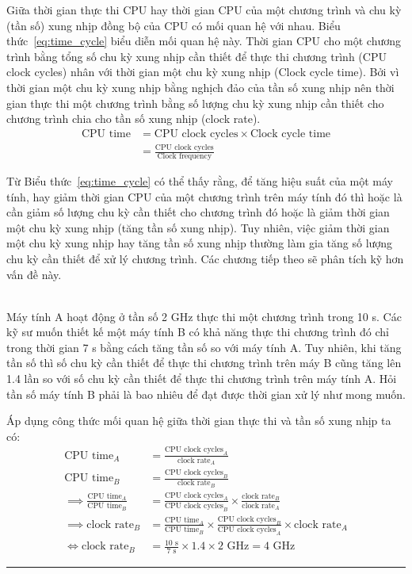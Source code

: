 Giữa thời gian thực thi CPU hay thời gian CPU của một chương trình và chu kỳ (tần số) xung nhịp đồng bộ của CPU có mối quan hệ với nhau. Biểu thức~\ref{eq:time_cycle} biểu diễn mối quan hệ này. Thời gian CPU cho một chương trình bằng tổng số chu kỳ xung nhịp cần thiết để thực thi chương trình (CPU clock cycles) nhân với thời gian một chu kỳ xung nhịp (Clock cycle time). Bởi vì thời gian một chu kỳ xung nhịp bằng nghịch đảo của tần số xung nhịp nên thời gian thực thi một chương trình bằng số lượng chu kỳ xung nhịp cần thiết cho chương trình chia cho tần số xung nhịp (clock rate).
\begin{align}
\label{eq:time_cycle}
\text{CPU time} &= \text{CPU clock cycles} \times \text{Clock cycle time} \nonumber\\
 &= \frac{\text{CPU clock cycles}}{\text{Clock frequency}}
\end{align}

Từ Biểu thức~\ref{eq:time_cycle} có thể thấy rằng, để tăng hiệu suất của một máy tính, hay giảm thời gian CPU của một chương trình trên máy tính đó thì hoặc là cần giảm số lượng chu kỳ cần thiết cho chương trình đó hoặc là giảm thời gian một chu kỳ xung nhịp (tăng tần số xung nhịp). Tuy nhiên, việc giảm thời gian một chu kỳ xung nhịp hay tăng tần số xung nhịp thường làm gia tăng số lượng chu kỳ cần thiết để xử lý chương trình. Các chương tiếp theo sẽ phân tích kỹ hơn vấn đề này.

\begin{exmp}
\hrulefill\\
Máy tính A hoạt động ở tần số 2 GHz thực thi một chương trình trong 10 s. Các kỹ sư muốn thiết kế một máy tính B có khả năng thực thi chương trình đó chỉ trong thời gian 7 s bằng cách tăng tần số so với máy tính A. Tuy nhiên, khi tăng tần số thì số chu kỳ cần thiết để thực thi chương trình trên máy B cũng tăng lên 1.4 lần so với số chu kỳ cần thiết để thực thi chương trình trên máy tính A. Hỏi tần số máy tính B phải là bao nhiêu để đạt được thời gian xử lý như mong muốn. 
\end{exmp}
\begin{answ}
Áp dụng công thức mối quan hệ giữa thời gian thực thi và tần số xung nhịp ta có:
\begin{align*}
\text{CPU time}_A &= \frac{\text{CPU clock cycles}_A}{\text{clock rate}_A}\\
\text{CPU time}_B &= \frac{\text{CPU clock cycles}_B}{\text{clock rate}_B}\\
\implies \frac{\text{CPU time}_A}{\text{CPU time}_B} &= \frac{\text{CPU clock cycles}_A}{\text{CPU clock cycles}_B} \times \frac{\text{clock rate}_B}{\text{clock rate}_A} \\
\implies \text{clock rate}_B &= \frac{\text{CPU time}_A}{\text{CPU time}_B} \times \frac{\text{CPU clock cycles}_B}{\text{CPU clock cycles}_A} \times \text{clock rate}_A \\
\Leftrightarrow \text{clock rate}_B &= \frac{10\text{ s}}{7\text{ s}} \times 1.4 \times 2\text{ GHz} = 4\text{ GHz}
\end{align*}
\hrule
\end{answ}

